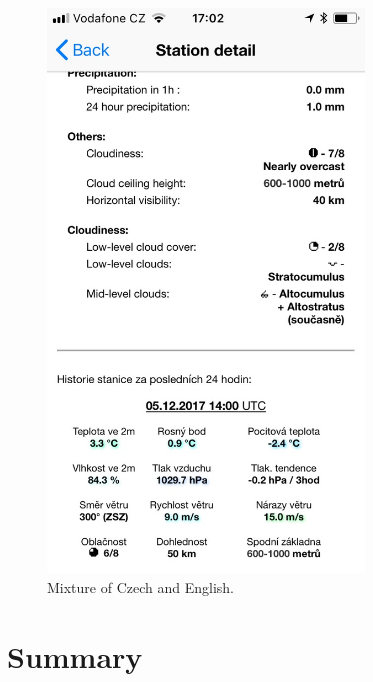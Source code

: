 \documentclass[11pt,a4paper]{article}
\begin{document}
\begin{figure}[htb]
\begin{minipage}[b]{0.49\textwidth}
        \includegraphics[width=0.75\textwidth]{czenglish}
        \caption{Mixture of Czech and English.}
        \label{fig:czeng}
    \end{minipage}


\end{figure}

\section{Summary}



{}

\end{document}

